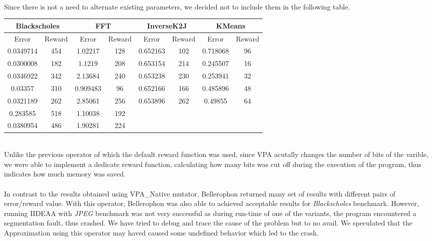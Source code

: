 \newpage
~\\
Since there is not a need to alternate existing parameters, we decided not to include them in the following table.\\
\begingroup
\begin{table}[H]
\begin{tabular}{|c|c|c|c|c|c|c|c|}
\hline
\multicolumn{2}{|c|}{Blackscholes} & \multicolumn{2}{c|}{FFT} & \multicolumn{2}{c|}{InverseK2J} & \multicolumn{2}{c|}{KMeans} \\ \hline
Error & Reward & Error & Reward & Error & Reward & Error & Reward \\ \hline
0.0349714 & 454 & 1.02217 & 128 & 0.652163 & 102 & 0.718068 & 96 \\ \hline
0.0300008 & 182 & 1.1219 & 208 & 0.653154 & 214 & 0.245507 & 16 \\ \hline
0.0346922 & 342 & 2.13684 & 240 & 0.653238 & 230 & 0.253941 & 32 \\ \hline
0.03357 & 310 & 0.909483 & 96 & 0.652166 & 166 & 0.485896 & 48 \\ \hline
0.0321189 & 262 & 2.85061 & 256 & 0.653896 & 262 & 0.49855 & 64 \\ \hline
0.283585 & 518 & 1.10038 & 192 &  &  &  &  \\ \hline
0.0380954 & 486 & 1.90281 & 224 &  &  &  &  \\ \hline
\end{tabular}
\end{table}
\endgroup
~\\
Unlike the previous operator of which the default reward function was used, since VPA acutally changes the number of bits of the varible, we were able to implement a dedicate reward function, calculating how many bits was cut off during the execution of the program, thus indicates how much memory was saved.\\
~\\
In contrast to the results obtained using VPA\_Native mutator, Bellerophon returned many set of results with different pairs of error/reward value. With this operator, Bellerophon was also able to achieved acceptable results for \textit{Blackscholes} benchmark. However, running IIDEAA with \textit{JPEG} benchmark was not very successful as during run-time of one of the variants, the program encountered a segmentation fault, thus crashed. We have tried to debug and trace the cause of the problem but to no avail. We speculated that the Approximation using this operator may haved caused some undefined behavior which led to the crash. \\

